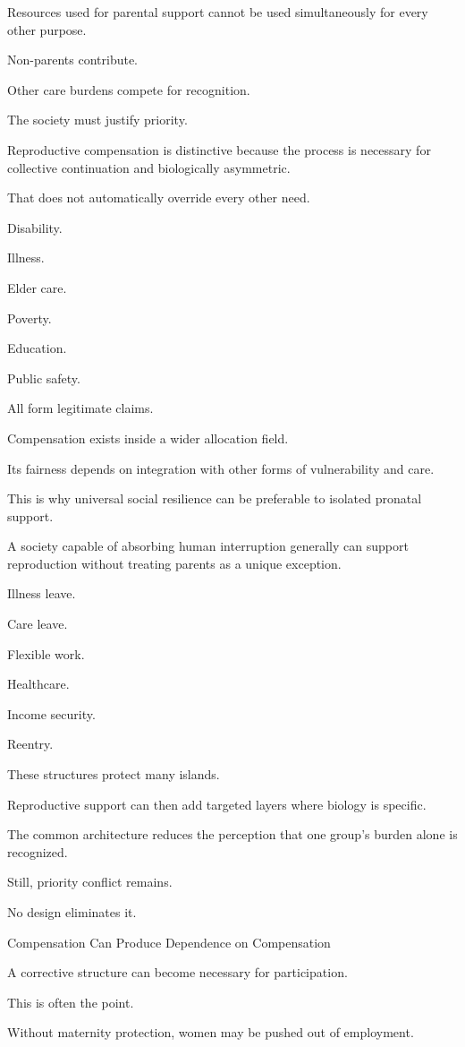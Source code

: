 Resources used for parental support cannot be used simultaneously for every other purpose.

Non-parents contribute.

Other care burdens compete for recognition.

The society must justify priority.

Reproductive compensation is distinctive because the process is necessary for collective continuation and biologically asymmetric.

That does not automatically override every other need.

Disability.

Illness.

Elder care.

Poverty.

Education.

Public safety.

All form legitimate claims.

Compensation exists inside a wider allocation field.

Its fairness depends on integration with other forms of vulnerability and care.

This is why universal social resilience can be preferable to isolated pronatal support.

A society capable of absorbing human interruption generally can support reproduction without treating parents as a unique exception.

Illness leave.

Care leave.

Flexible work.

Healthcare.

Income security.

Reentry.

These structures protect many islands.

Reproductive support can then add targeted layers where biology is specific.

The common architecture reduces the perception that one group’s burden alone is recognized.

Still, priority conflict remains.

No design eliminates it.

Compensation Can Produce Dependence on Compensation

A corrective structure can become necessary for participation.

This is often the point.

Without maternity protection, women may be pushed out of employment.

